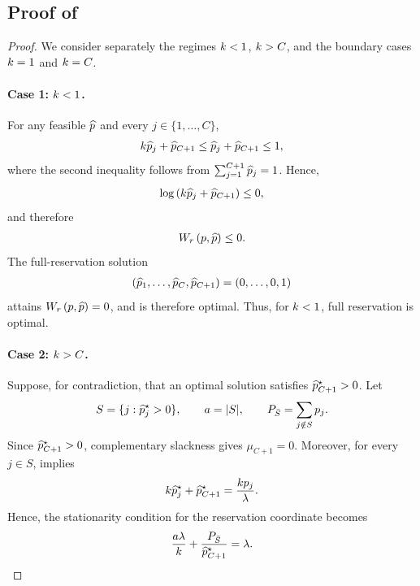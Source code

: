 \subsection{Proof of }
\label{sec:proof_threshold}
\theoremThreshold*
\begin{proof}
    We consider separately the regimes \(k<1\), \(k>C\), and the boundary cases \(k=1\) and \(k=C\).

    \paragraph{Case 1: \(k<1\).}
    For any feasible \(\widehat{p}\) and every \(j\in\{1,\ldots,C\}\),
    \begin{align*}
        k\widehat{p}_j+\widehat{p}_{C+1}\le\widehat{p}_j+\widehat{p}_{C+1}\le1,
    \end{align*}
    where the second inequality follows from \(\sum_{j=1}^{C+1}\widehat{p}_j=1\). Hence,
    \begin{align*}
        \log\left(k\widehat{p}_j+\widehat{p}_{C+1}\right)\le0,
    \end{align*}
    and therefore
    \begin{align*}
        \W{r}\le0.
    \end{align*}
    The full-reservation solution
    \begin{align*}
        (\widehat{p}_1,\ldots,\widehat{p}_C,\widehat{p}_{C+1})=(0,\ldots,0,1)
    \end{align*}
    attains \(\W{r}=0\), and is therefore optimal. Thus, for \(k<1\), full reservation is optimal.

    \paragraph{Case 2: \(k>C\).}
    Suppose, for contradiction, that an optimal solution satisfies \(\widehat{p}_{C+1}^\star>0\). Let
    \begin{align*}
        S=\{j:\widehat{p}_j^\star>0\}, \qquad a=|S|, \qquad P_{\bar S}=\sum_{j\notin S}p_j.
    \end{align*}
    Since \(\widehat{p}_{C+1}^\star>0\), complementary slackness gives \(\mu_{C+1}=0\). Moreover, for every \(j\in S\),  implies
    \begin{align*}
        k\widehat{p}_j^\star+\widehat{p}_{C+1}^\star=\frac{k p_j}{\lambda}.
    \end{align*}
    Hence, the stationarity condition for the reservation coordinate becomes
    \begin{align*}
        \frac{a\lambda}{k}+\frac{P_{\bar S}}{\widehat{p}_{C+1}^\star}=\lambda.
    \end{align*}


\end{proof}
